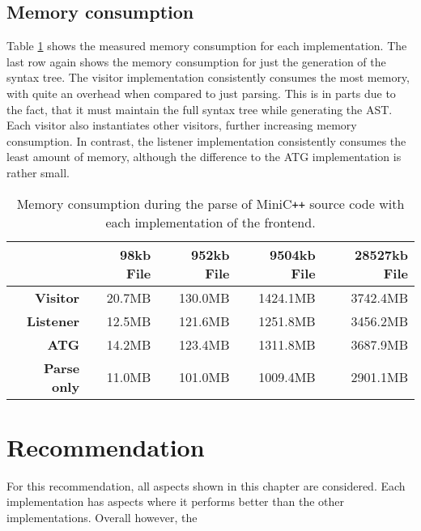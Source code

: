 \subsection{Memory consumption}

Table \ref{tab:ParseMemory} shows the measured memory consumption for each implementation. The last row again shows the memory consumption for just the generation of the syntax tree. The visitor implementation consistently consumes the most memory, with quite an overhead when compared to just parsing. This is in parts due to the fact, that it must maintain the full syntax tree while generating the AST. Each visitor also instantiates other visitors, further increasing memory consumption. In contrast, the listener implementation consistently consumes the least amount of memory, although the difference to the ATG implementation is rather small. 


\begin{table}[!ht]
    \centering
    \caption{Memory consumption during the parse of MiniC\texttt{++} source code with each implementation of the frontend.}
    \label{tab:ParseMemory}
    \begin{tabular}{|r|r|r|r|r|}
    \hline
         & 98kb File & 952kb File & 9504kb File & 28527kb File \\ \hline
        \textbf{Visitor} & 20.7MB & 130.0MB & 1424.1MB & 3742.4MB \\ \hline
        \textbf{Listener} & 12.5MB & 121.6MB & 1251.8MB & 3456.2MB \\ \hline
        \textbf{ATG} & 14.2MB & 123.4MB & 1311.8MB & 3687.9MB \\ \hline
        \textbf{Parse only} & 11.0MB & 101.0MB & 1009.4MB & 2901.1MB \\ \hline
    \end{tabular}
\end{table}


\section{Recommendation}

For this recommendation, all aspects shown in this chapter are considered. Each implementation has aspects where it performs better than the other implementations. Overall however, the 